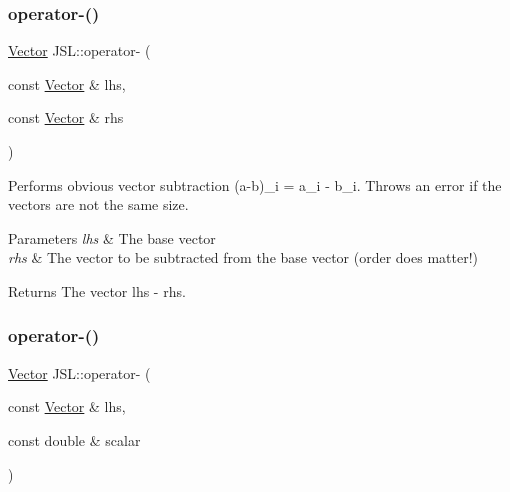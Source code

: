 \subsubsection{\texorpdfstring{operator-\/()}{operator-()}\hspace{0.1cm}{\footnotesize\ttfamily [1/6]}}
{\footnotesize\ttfamily \hyperlink{classJSL_1_1Vector}{Vector} J\+S\+L\+::operator-\/ (\begin{DoxyParamCaption}\item[{const \hyperlink{classJSL_1_1Vector}{Vector} \&}]{lhs,  }\item[{const \hyperlink{classJSL_1_1Vector}{Vector} \&}]{rhs }\end{DoxyParamCaption})\hspace{0.3cm}{\ttfamily [inline]}}



Performs obvious vector subtraction (a-\/b)\+\_\+i = a\+\_\+i -\/ b\+\_\+i. Throws an error if the vectors are not the same size. 


\begin{DoxyParams}{Parameters}
{\em lhs} & The base vector \\
\hline
{\em rhs} & The vector to be subtracted from the base vector (order does matter!) \\
\hline
\end{DoxyParams}
\begin{DoxyReturn}{Returns}
The vector lhs -\/ rhs. 
\end{DoxyReturn}
\mbox{\label{namespaceJSL_ac6bd9311dd73aa6227d826bdb94e748d}} 
\subsubsection{\texorpdfstring{operator-\/()}{operator-()}\hspace{0.1cm}{\footnotesize\ttfamily [2/6]}}
{\footnotesize\ttfamily \hyperlink{classJSL_1_1Vector}{Vector} J\+S\+L\+::operator-\/ (\begin{DoxyParamCaption}\item[{const \hyperlink{classJSL_1_1Vector}{Vector} \&}]{lhs,  }\item[{const double \&}]{scalar }\end{DoxyParamCaption})\hspace{0.3cm}{\ttfamily [inline]}}



